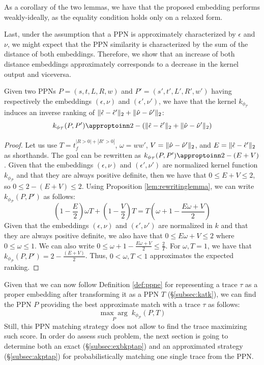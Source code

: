 As a corollary of the two lemmas, we have that the proposed embedding performs weakly-ideally, as the equality condition holds only on a relaxed form.

Last, under the assumption that a PPN is approximately characterized by $\epsilon$ and $\nu$, we might expect that the PPN similarity is characterized by the sum of the distance of both embeddings. Therefore, we show that an increase of both distance embeddings approximately corresponds to a decrease in the kernel output and viceversa.

\begin{lemma}\label{lem:approxRank}
Given two PPNs $P=(s,t,L,R,w)$ and $P'=(s',t',L',R',w')$ having respectively the embeddings $(\epsilon,\nu)$ and $(\epsilon',\nu')$, we have that the kernel $k_{\phi_{\mathcal{T}}}$ induces an inverse ranking of $\|\hat{\epsilon}-\hat{\epsilon}'\|_{2}+\|\hat{\nu}-\hat{\nu}'\|_{2}$:
$$k_{\phi_{\mathcal{T}}}(P,P')\appropto 2-(\norm{\hat{\epsilon}-\hat{\epsilon}'}{2}+\norm{\hat{\nu}-\hat{\nu}'}{2})$$
\end{lemma}
\begin{proof}
Let us use $T=t_f^{|R>0|+|R'>0|}$, $\omega=ww'$, $V=\|\hat{\nu}-\hat{\nu}'\|_{2}$, and $E=\|\hat{\epsilon}-\hat{\epsilon}'\|_{2}$ as shorthands. The goal can be rewritten as $k_{\phi_{\mathcal{T}}}(P,P')\appropto 2-(E+V)$. Given that the embeddings $(\epsilon,\nu)$ and $(\epsilon',\nu')$ are normalized kernel function $k_{\phi_{\mathcal{P}}}$ and that they are always positive definite, then we have that $0\leq E +V\leq 2$, so $0\leq 2-(E+V)\leq 2$. Using Proposition \ref{lem:rewritinglemma}, we can write $k_{\phi_{\mathcal{P}}}(P,P')$ as follows:
$$\left(1-\frac{E}{2}\right)\omega T+\left(1-\frac{V}{2}\right)T=T\left(\omega+1-\frac{E\omega+V}{2}\right)$$
Given that the embeddings $(\epsilon,\nu)$ and $(\epsilon',\nu')$ are normalized in $k$ and that they are always positive definite,  we also have that $0\leq E\omega +V\leq 2$ where $0\leq \omega\leq 1$. We can also write  $0\leq \omega+1-\frac{E\omega+V}{2}\leq \frac{2}{T}$. For $\omega,T=1$, we have that $k_{\phi_{\mathcal{P}}}(P,P')=2-\frac{(E+V)}{2}$. Thus, $0<\omega,T<1$ approximates the expected ranking. 
\end{proof}

Given that we can now follow Definition \ref{def:ppne} for representing a trace $\tau$ as a proper embedding after transforming it as a PPN $T$ (\S\ref{subsec:katk}), we can find the PPN $P$ providing the best approximate match with  a trace $\tau$ as follows:
\[\underset{{P}}{\max\arg}\;k_{\phi_{\mathcal{P}}}(P,T)\]
Still, this PPN matching strategy does not allow to find the trace maximizing such score. In order do assess such problem, the next section is going to determine both an exact (\S\ref{subsec:exbkptap}) and an approximated strategy (\S\ref{subsec:akptap}) for probabilistically matching one single trace from the PPN.
